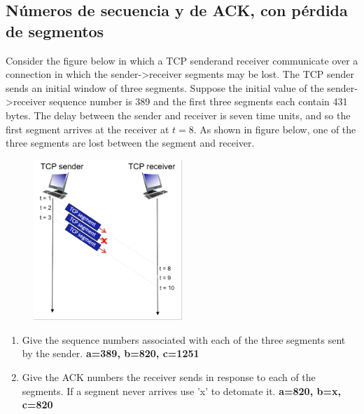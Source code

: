 \subsection*{N\'umeros de secuencia y de ACK, con p\'erdida de segmentos}
\noindent Consider the figure below in which a TCP senderand receiver communicate over a connection in which the sender->receiver segments may be lost. The TCP sender sends
an initial window of three segments. Suppose the initial value of the sender->receiver sequence number is 389 and the first three segments each contain 431 bytes. The delay
between the sender and receiver is seven time units, and so the first segment arrives at the receiver at \(t=8\). As shown in figure below, one of the three segments are lost
between the segment and receiver.
\begin{figure}[H]
    \centering
    \includegraphics[width=0.5\textwidth]{img/tcpls_3b.png}
\end{figure}
\begin{enumerate}
    \item Give the sequence numbers associated with each of the three segments sent by the sender. \textbf{a=389, b=820, c=1251}
    \item Give the ACK numbers the receiver sends in response to each of the segments. If a segment never arrives use 'x' to detomate it. \textbf{a=820, b=x, c=820}
\end{enumerate}

